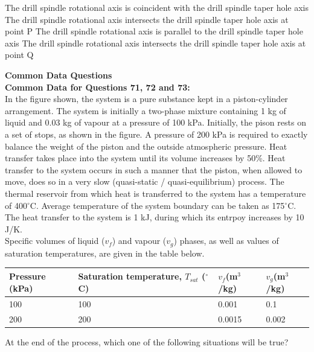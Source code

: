 \documentclass[addpoints,11pt]{exam}
\begin{document}
\begin{questions}
    \begin{choices}
        \choice The drill spindle rotational axis is coincident with the drill spindle taper hole axis
        \choice The drill spindle rotational axis intersects the drill spindle taper hole axis at point P
        \choice The drill spindle rotational axis is parallel to the drill spindle taper hole axis
        \choice The drill spindle rotational axis intersects the drill spindle taper hole axis at point Q
    \end{choices}

\pagebreak
\large\textbf{Common Data Questions}\\
\normalsize\textbf{Common Data for Questions 71, 72 and 73:}\\

In the figure shown, the system is a pure substance kept in a piston-cylinder arrangement. The system is initially a two-phase mixture containing 1 kg of liquid and 0.03 kg of vapour at a pressure of 100 kPa. Initially, the pison rests on a set of stops, as shown in the figure. A pressure of 200 kPa is required to exactly balance the weight of the piston and the outside atmospheric pressure. Heat transfer takes place into the system until its volume increases by 50\%. Heat transfer to the system occurs in such a manner that the piston, when allowed to move, does so in a very slow (quasi-static / quasi-equilibrium) process. The thermal reservoir from which heat is transferred to the system has a temperature of 400$^\circ$C. Average temperature of the system boundary can be taken as 175$^\circ$C. The heat transfer to the system is 1 kJ, during which its entrpoy increases by 10 J/K.%
\\Specific volumes of liquid ($v_f$) and vapour ($v_g$) phases, as well as values of saturation temperatures, are given in the table below.
\begin{center}
    \begin{tabular}{|l|l|l|l|}
        \hline
        Pressure (kPa)&Saturation temperature, $T_{sat}$ ($^\circ$C)&$v_f$(m$^3$/kg)&$v_g$(m$^3$/kg)\\\hline
        100 & 100 & 0.001 & 0.1\\\hline
        200 & 200 & 0.0015 & 0.002\\\hline
        
    \end{tabular}
\end{center}

    \question At the end of the process, which one of the following situations will be true?\\


\end{questions}
\end{document}
